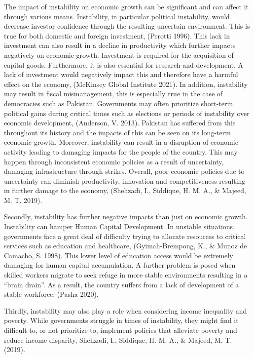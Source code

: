 \documentclass[11pt]{article}
\begin{document}
The impact of instability on economic growth can be significant and can affect it through various means. Instability, in particular political instability, would decrease investor confidence through the resulting uncertain environment. This is true for both domestic and foreign investment, (Perotti 1996). This lack in investment can also result in a decline in productivity which further impacts negatively on economic growth. Investment is required for the acquisition of capital goods. Furthermore, it is also essential for research and development. A lack of investment would negatively impact this and therefore have a harmful effect on the economy, (McKinsey Global Institute 2021). In addition, instability may result in fiscal mismanagement, this is especially true in the case of democracies such as Pakistan. Governments may often prioritize short-term political gains during critical times such as elections or periods of instability over economic development, (Anderson, V. 2013). Pakistan has suffered from this throughout its history and the impacts of this can be seen on its long-term economic growth. Moreover, instability can result in a disruption of economic activity leading to damaging impacts for the people of the country. This may happen through inconsistent economic policies as a result of uncertainty, damaging infrastructure through strikes. Overall, poor economic policies due to uncertainty can diminish productivity, innovation and competitiveness resulting in further damage to the economy, (Shehzadi, I., Siddique, H. M. A., \& Majeed, M. T. 2019). \newline

Secondly, instability has further negative impacts than just on economic growth. Instability can hamper Human Capital Development. In unstable situations, governments face a great deal of difficulty trying to allocate resources to critical services such as education and healthcare, (Gyimah-Brempong, K., \& Munoz de Camacho, S. 1998). This lower level of education access would be extremely damaging for human capital accumulation. A further problem is posed when skilled workers migrate to seek refuge in more stable environments resulting in a “brain drain”. As a result, the country suffers from a lack of development of a stable workforce, (Pasha 2020). \newline

Thirdly, instability may also play a role when considering income inequality and poverty. While governments struggle in times of instability, they might find it difficult to, or not prioritize to, implement policies that alleviate poverty and reduce income disparity, Shehzadi, I., Siddique, H. M. A., \& Majeed, M. T. (2019). \newline
\end{document}
